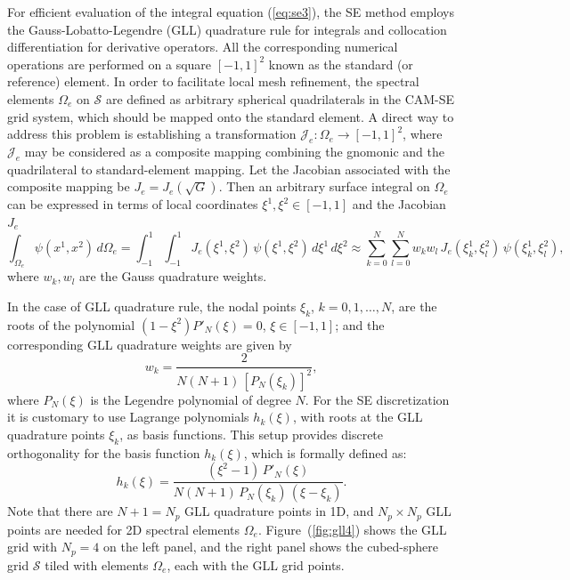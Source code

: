\documentclass{agujournal}
\begin{document}
{ For efficient evaluation of the integral equation (\ref{eq:se3}), the SE  method employs the Gauss-Lobatto-Legendre (GLL) 
  quadrature rule for integrals and collocation differentiation for derivative operators. All the corresponding numerical 
  operations are performed on a square   $[-1,1]^2$ known as  the standard  (or reference) element.   
 In order to facilitate local mesh refinement,   
  the spectral elements  $\Omega_e$  on $\mathcal{S}$ are defined as arbitrary spherical quadrilaterals
  in  the CAM-SE  grid system, which should   be  mapped onto  the standard element.
  A direct  way to address this problem is establishing  %
  a  transformation  $\mathcal{J}_e: \Omega_e \rightarrow [-1,1]^2$, where    $\mathcal{J}_e$
  may be considered as   a  composite mapping combining the gnomonic and  the quadrilateral to standard-element mapping.
  Let the Jacobian  associated  with the composite mapping be $J_e = J_e(\sqrt{G})$.
   Then   an  arbitrary surface integral  on $\Omega_e$ can be expressed in terms of local coordinates $\xi^1, \xi^2 \in [-1, 1] $
 and the Jacobian  $J_e$ 
   \begin{equation}
 \int_{\Omega_e} \psi (x^1,x^2) \,  d\Omega_e =   \int_{-1}^{1} \int_{-1}^{1} J_e(\xi^1,\xi^2)  \,  \psi(\xi^1,\xi^2) \, d\xi^1 \, d\xi^2
   \approx   \sum_{k=0}^{N}   \sum_{l=0}^{N} w_k w_l \, J_e(\xi^1_k,\xi^2_l) \,   \psi(\xi^1_k,\xi^2_l),
                               \label{eq:se4} 
 \end{equation} 
 where  $w_k, w_l$  are  the  Gauss  quadrature weights. 
 
 In the  case of GLL quadrature rule, the  nodal points $\xi_k$, $k=0, 1, \dots, N$, 
 are  the roots of  the polynomial $(1-\xi^2) P'_N(\xi) = 0$,
 $\xi \in [-1,1]$;   and the corresponding  GLL quadrature  weights are given by 
 \[   w_k =  \frac{2}{N(N+1) \, [P_N(\xi_k)]^2 },
 \] 
  where  $P_N(\xi)$ is the  Legendre polynomial of degree $N$. 
   For the SE discretization it is customary to use  Lagrange polynomials  $h_k(\xi)$,   with roots at  the 
 GLL   quadrature points $\xi_k$, as basis functions.  This setup provides  discrete orthogonality 
 for  the basis function $h_k(\xi)$,  which   is formally defined as: 
 \begin{equation}
    h_k(\xi) = \frac{ (\xi^2-1)\, P'_N(\xi)}{ N (N+1)\, P_N(\xi_k) \,(\xi-\xi_k)}.   \label{eq:se5}
 \end{equation}
  Note that there are $N+1 = N_p$ GLL quadrature points in 1D,
 and $N_p \times N_p$ GLL points are needed for 2D spectral elements $\Omega_e$. 
 Figure~(\ref{fig:gll4}) shows the GLL grid  with $N_p =4$ on the left panel, 
 and the right panel shows the cubed-sphere grid $\mathcal{S}$ tiled with elements $\Omega_e$,
 each with the GLL  grid points. 
 
}
\end{document}
